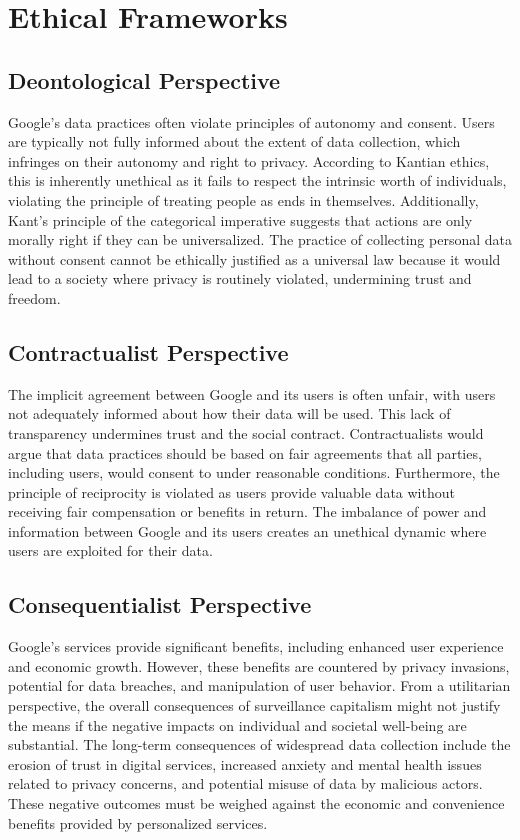 \section{Ethical Frameworks}\label{sec:ethical-frameworks}

\subsection{Deontological Perspective}\label{subsec:deontological-perspective}
Google's data practices often violate principles of autonomy and consent.
Users are typically not fully informed about the extent of data collection, which infringes on their autonomy and right to privacy.
According to Kantian ethics, this is inherently unethical as it fails to respect the intrinsic worth of individuals, violating the principle of treating people as ends in themselves.
Additionally, Kant's principle of the categorical imperative suggests that actions are only morally right if they can be universalized.
The practice of collecting personal data without consent cannot be ethically justified as a universal law because it would lead to a society where privacy is routinely violated, undermining trust and freedom.
\subsection{Contractualist Perspective}\label{subsec:contractualist-perspective}
The implicit agreement between Google and its users is often unfair, with users not adequately informed about how their data will be used.
This lack of transparency undermines trust and the social contract.
Contractualists would argue that data practices should be based on fair agreements that all parties, including users, would consent to under reasonable conditions.
Furthermore, the principle of reciprocity is violated as users provide valuable data without receiving fair compensation or benefits in return.
The imbalance of power and information between Google and its users creates an unethical dynamic where users are exploited for their data.
\subsection{Consequentialist Perspective}\label{subsec:consequentialist-perspective}
Google's services provide significant benefits, including enhanced user experience and economic growth.
However, these benefits are countered by privacy invasions, potential for data breaches, and manipulation of user behavior.
From a utilitarian perspective, the overall consequences of surveillance capitalism might not justify the means if the negative impacts on individual and societal well-being are substantial.
The long-term consequences of widespread data collection include the erosion of trust in digital services, increased anxiety and mental health issues related to privacy concerns, and potential misuse of data by malicious actors.
These negative outcomes must be weighed against the economic and convenience benefits provided by personalized services.
